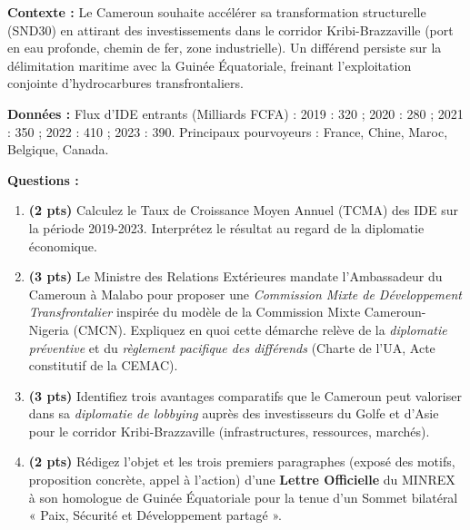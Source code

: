 \documentclass[11pt]{article}
\begin{document}
\begin{exercice}
\textbf{Contexte :} Le Cameroun souhaite accélérer sa transformation structurelle (SND30) en attirant des investissements dans le corridor Kribi-Brazzaville (port en eau profonde, chemin de fer, zone industrielle). Un différend persiste sur la délimitation maritime avec la Guinée Équatoriale, freinant l'exploitation conjointe d'hydrocarbures transfrontaliers.

\textbf{Données :} Flux d'IDE entrants (Milliards FCFA) : 2019 : 320 ; 2020 : 280 ; 2021 : 350 ; 2022 : 410 ; 2023 : 390. Principaux pourvoyeurs : France, Chine, Maroc, Belgique, Canada.

\textbf{Questions :}
\begin{enumerate}
    \item \textbf{(2 pts)} Calculez le Taux de Croissance Moyen Annuel (TCMA) des IDE sur la période 2019-2023. Interprétez le résultat au regard de la diplomatie économique.
    \item \textbf{(3 pts)} Le Ministre des Relations Extérieures mandate l'Ambassadeur du Cameroun à Malabo pour proposer une \emph{Commission Mixte de Développement Transfrontalier} inspirée du modèle de la Commission Mixte Cameroun-Nigeria (CMCN). Expliquez en quoi cette démarche relève de la \emph{diplomatie préventive} et du \emph{règlement pacifique des différends} (Charte de l'UA, Acte constitutif de la CEMAC).
    \item \textbf{(3 pts)} Identifiez trois avantages comparatifs que le Cameroun peut valoriser dans sa \emph{diplomatie de lobbying} auprès des investisseurs du Golfe et d'Asie pour le corridor Kribi-Brazzaville (infrastructures, ressources, marchés).
    \item \textbf{(2 pts)} Rédigez l'objet et les trois premiers paragraphes (exposé des motifs, proposition concrète, appel à l'action) d'une \textbf{Lettre Officielle} du MINREX à son homologue de Guinée Équatoriale pour la tenue d'un Sommet bilatéral « Paix, Sécurité et Développement partagé ».
\end{enumerate}
\end{exercice}
\end{document}
